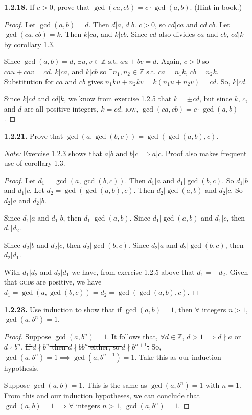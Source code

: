 \documentclass[12pt]{article}
\newcommand{\zee}{\mathbb{Z}}
\newcommand{\such}{\text{ s.t. }}
\begin{document}
\begin{itemize}
\item[\textbf{1.2.18.}] If $c>0$, prove that $\gcd(ca,cb)=c\cdot \gcd(a,b)$. (Hint in book.)

\begin{proof}
Let $\gcd(a,b)=d$.
Then $d|a$, $d|b$.
$c>0$, so $cd|ca$ and $cd|cb$.
Let $\gcd(ca,cb)=k$.
Then $k|ca$, and $k|cb$.
Since $cd$ also divides $ca$ and $cb$, $cd|k$ by corollary 1.3.
\par
Since $\gcd(a,b)=d$, $\exists u,v \in \zee \such au+bv=d$.
Again, $c>0$ so $cau+cav=cd$.
$k|ca$, and $k|cb$ so $\exists n_1, n_2 \in \zee \such ca={n_1}k$, $cb={n_2}k$.
Substitution for $ca$ and $cb$ gives ${n_1}ku+{n_2}kv=k({n_1}u+{n_2}v)=cd$.
So, $k|cd$.
\par
Since $k|cd$ and $cd|k$, we know from exercise 1.2.5 that $k = \pm cd$, but since $k$, $c$, and $d$ are all positive integers, $k = cd$.
\textsc{iow}, $\gcd(ca,cb) = c \cdot \gcd(a,b)$.
\end{proof}



\item[\textbf{1.2.21.}] Prove that $\gcd(a,\gcd(b,c))=\gcd(\gcd(a,b),c)$.
\par\textit{Note:} Exercise 1.2.3 shows that $a|b \text{ and } b|c \implies a|c$. Proof also makes frequent use of corollary 1.3.

\begin{proof}
Let $d_1 = \gcd(a,\gcd(b,c))$. Then $d_1|a$ and $d_1|\gcd(b,c)$. So $d_1|b$ and $d_1|c$.
Let $d_2 = \gcd(\gcd(a,b),c)$. Then $d_2|\gcd(a,b)$ and $d_2|c$. So $d_2|a$ and $d_2|b$.
\par
Since $d_1|a$ and $d_1|b$, then $d_1|\gcd(a,b)$.
Since $d_1|\gcd(a,b)$ and $d_1|c$, then $d_1|d_2$.
\par
Since $d_2|b$ and $d_2|c$, then $d_2|\gcd(b,c)$.
Since $d_2|a$ and $d_2|\gcd(b,c)$, then $d_2|d_1$.
\par
With $d_1|d_2$ and $d_2|d_1$ we have, from exercise 1.2.5 above that $d_1 = \pm d_2$.
Given that \textsc{gcd}s are positive, we have $d_1 = \gcd(a,\gcd(b,c)) = d_2 = \gcd(\gcd(a,b),c)$.
\end{proof}



\item[\textbf{1.2.23.}] Use induction to show that if $\gcd(a,b)=1$, then $\forall$ integers $n>1$, $\gcd(a,b^n)=1$.

\begin{proof}
Suppose $\gcd(a,b^n) = 1$. It follows that, $\forall d \in \zee$, $d > 1 \implies d \nmid a$ or $d \nmid b^n$.
\st{If $d \nmid b^n$ then $d \nmid b b^n$ either, so $d \nmid b^{n+1}$.}
So, $\gcd(a,b^n) = 1 \implies \gcd(a,b^{n+1})=1$. Take this as our induction hypothesis.
\par
Suppose $\gcd(a,b)=1$. This is the same as $\gcd(a,b^n) = 1$ with $n=1$.
From this and our induction hypotheses, we can conclude that $\gcd(a,b)=1 \implies \forall$ integers $n>1$, $\gcd(a,b^n)=1$.
\end{proof}




\end{itemize}
\end{document}
